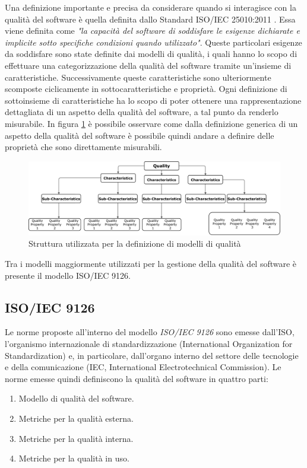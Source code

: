 Una definizione importante e precisa da considerare quando si interagisce con la qualità del software è quella definita dallo Standard ISO/IEC 25010:2011 \cite{ieee25010}.
Essa viene definita come \textit{"la capacità del software di soddisfare le esigenze dichiarate e implicite sotto specifiche condizioni quando utilizzato"}.
Queste particolari esigenze da soddisfare sono state definite dai modelli di qualità, i quali hanno lo scopo di effettuare una categorizzazione della qualità del software tramite un'insieme di caratteristiche.
Successivamente queste caratteristiche sono ulteriormente scomposte ciclicamente in sottocaratteristiche e proprietà.
Ogni definizione di sottoinsieme di caratteristiche ha lo scopo di poter ottenere una rappresentazione dettagliata di un aspetto della qualità del software, a tal punto da renderlo misurabile. In figura \ref{fig:quality_model_def} è possibile osservare come dalla definizione generica di un aspetto della qualità del software è possibile quindi andare a definire delle proprietà che sono direttamente misurabili.
\begin{figure}[h]
    \centering
    \includegraphics[width=1\textwidth]{Figure/Background/quality_def.pdf}
    \caption{Struttura utilizzata per la definizione di modelli di qualità}
    \label{fig:quality_model_def}
\end{figure}

Tra i modelli maggiormente utilizzati per la gestione della qualità del software è presente il modello ISO/IEC 9126.

\subsection{ISO/IEC 9126}
Le norme proposte all'interno del modello \textit{ISO/IEC 9126} sono emesse dall'ISO, l'organismo internazionale di standardizzazione (International Organization for Standardization) e, in particolare, dall'organo interno del settore delle tecnologie e della comunicazione (IEC, International Electrotechnical Commission).
Le norme emesse quindi definiscono la qualità del software in quattro parti: 
\begin{enumerate}
    \item Modello di qualità del software.
    \item Metriche per la qualità esterna.
    \item Metriche per la qualità interna.
    \item Metriche per la qualità in uso.
\end{enumerate}


